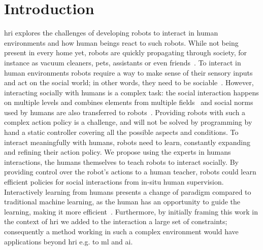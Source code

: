 \chapter{Introduction} \label{chap:intro}
\graphicspath{{images/intro/}}
\glsresetall


\gls{hri} explores the challenges of developing robots to interact in human environments and how human beings react to such robots. While not being present in every home yet, robots are quickly propagating through society, for instance as vacuum cleaners, pets, assistants or even friends~\citep{belpaeme2012multimodal}. 
To interact in human environments robots require a way to make sense of their sensory inputs and act on the social world; in other words, they need to be sociable~\citep{breazeal2004designing}. However, interacting socially with humans is a complex task: the social interaction happens on multiple levels and combines elements from multiple fields~\citep{fong2003survey} and social norms used by humans are also transferred to robots~\citep{bartneck2004design}. Providing robots with such a complex action policy is a challenge, and will not be solved by programming by hand a static controller covering all the possible aspects and conditions. To interact meaningfully with humans, robots need to learn, constantly expanding and refining their action policy. We propose using the experts in humans interactions, the humans themselves to teach robots to interact socially. By providing control over the robot's actions to a human teacher, robots could learn efficient policies for social interactions from in-situ human supervision. Interactively learning from humans presents a change of paradigm compared to traditional machine learning, as the human has an opportunity to guide the learning, making it more efficient~\citep{fails2003interactive,amershi2014power}. Furthermore, by initially framing this work in the context of \gls{hri} we added to the interaction a large set of constraints; consequently a method working in such a complex environment would have applications beyond \gls{hri} e.g. to \gls{ml} and \gls{ai}.


%
%
%

